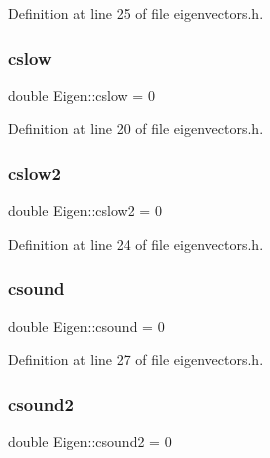 Definition at line 25 of file eigenvectors.\+h.

\mbox{\label{classEigen_aedf1e70a55fc3f9917bcaf4c386d7957}} 
\subsubsection{\texorpdfstring{cslow}{cslow}}
{\footnotesize\ttfamily double Eigen\+::cslow = 0\hspace{0.3cm}{\ttfamily [private]}}



Definition at line 20 of file eigenvectors.\+h.

\mbox{\label{classEigen_adf1df050d6ddc1098315e88c31d2dbec}} 
\subsubsection{\texorpdfstring{cslow2}{cslow2}}
{\footnotesize\ttfamily double Eigen\+::cslow2 = 0\hspace{0.3cm}{\ttfamily [private]}}



Definition at line 24 of file eigenvectors.\+h.

\mbox{\label{classEigen_ab8e8bcd0685d32e9052619cd58a3919c}} 
\subsubsection{\texorpdfstring{csound}{csound}}
{\footnotesize\ttfamily double Eigen\+::csound = 0\hspace{0.3cm}{\ttfamily [private]}}



Definition at line 27 of file eigenvectors.\+h.

\mbox{\label{classEigen_a1fc1267dd40506297059046aac157263}} 
\subsubsection{\texorpdfstring{csound2}{csound2}}
{\footnotesize\ttfamily double Eigen\+::csound2 = 0\hspace{0.3cm}{\ttfamily [private]}}



